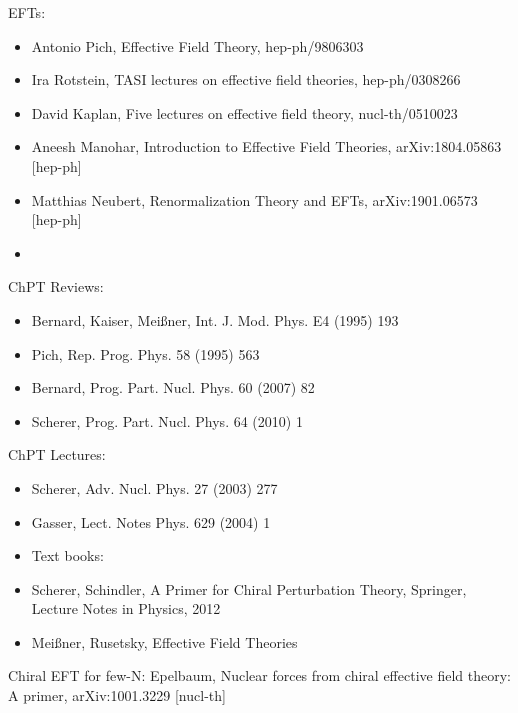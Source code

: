 \documentclass[11pt]{latex/exercise}
\begin{document}
{    \item EFTs:
    \begin{itemize}
    \item
    Antonio Pich, Effective Field Theory, hep-ph/9806303
    \item
    Ira Rotstein, TASI lectures on effective field theories, hep-ph/0308266
    \item
    David Kaplan, Five lectures on effective field theory, nucl-th/0510023
    \item
    Aneesh Manohar, Introduction to Effective Field Theories, arXiv:1804.05863 [hep-ph]
    \item
    Matthias Neubert, Renormalization Theory and EFTs, arXiv:1901.06573 [hep-ph]
    \item
    \end{itemize}
    \item ChPT Reviews:
    \begin{itemize}
    \item
    Bernard, Kaiser, Meißner, Int. J. Mod. Phys. E4 (1995) 193
    \item
    Pich, Rep. Prog. Phys. 58 (1995) 563
    \item
    Bernard, Prog. Part. Nucl. Phys. 60 (2007) 82
    \item
    Scherer, Prog. Part. Nucl. Phys. 64 (2010) 1
    \end{itemize}
    \item ChPT Lectures:
    \begin{itemize}
    \item
    Scherer, Adv. Nucl. Phys. 27 (2003) 277
    \item
    Gasser, Lect. Notes Phys.  629 (2004) 1
    \item
    Text books:
    \item
    Scherer, Schindler, A Primer for Chiral Perturbation Theory, Springer, Lecture Notes in Physics, 2012
    \item
    Meißner, Rusetsky, Effective Field Theories
    \end{itemize}
    \item Chiral EFT for few-N:
    Epelbaum, Nuclear forces from chiral effective field theory: A primer, arXiv:1001.3229 [nucl-th]
}

\afternoon

\newcommand{\dd}{\mathrm{d}}
\newcommand{\eins}{\mathds{1}}
\newcommand{\vs}{\slashed{v}}
\renewcommand{\L}{\mathcal{L}}
\end{document}
